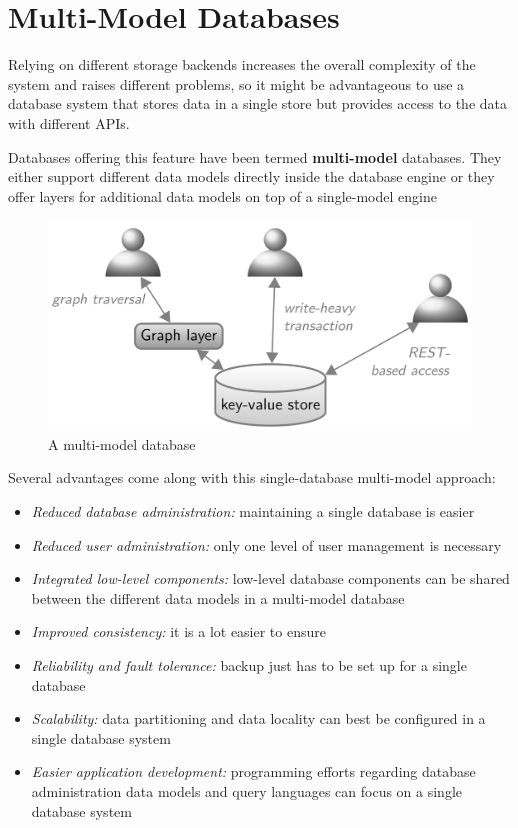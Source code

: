 \newpage
\section{Multi-Model Databases}
Relying on different storage backends increases the overall complexity of the system and raises different problems, so it might be advantageous to use a database system that stores data in a single store but provides access to the data with different APIs. 
\begin{tcolorbox}
Databases offering this feature have been termed \textbf{multi-model} databases. They either support different data models directly inside the database engine or they offer layers for additional data models on top of a single-model engine
\end{tcolorbox}
\begin{figure}[!h]
        \centering
        \includegraphics[width=0.7\linewidth]{images/AdvancedDataManagment/polyglot_database_architectures/multimodel_db.jpeg}
        \caption{A multi-model database}
    \end{figure}

Several advantages come along with this single-database multi-model approach:
\begin{itemize}
    \item \textit{Reduced database administration:} maintaining a single database is easier
    \item \textit{Reduced user administration:} only one level of user management is necessary
    \item \textit{Integrated low-level components:} low-level database components can be shared between the different data models in a multi-model database
    \item \textit{Improved consistency:} it is a lot easier to ensure
    \item \textit{Reliability and fault tolerance:} backup just has to be set up for a single database
    \item \textit{Scalability:} data partitioning and data locality can best be configured in a single database system
    \item \textit{Easier application development:} programming efforts regarding database administration  data models and query languages can focus on a single database system
\end{itemize}